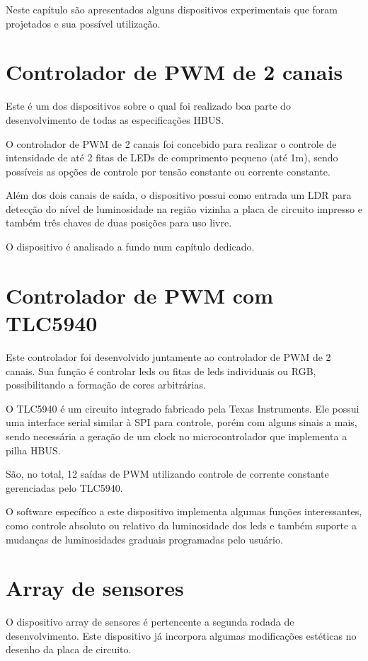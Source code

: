 Neste capítulo são apresentados alguns dispositivos experimentais que foram projetados e sua possível utilização.

\section{Controlador de PWM de 2 canais}

Este é um dos dispositivos sobre o qual foi realizado boa parte do desenvolvimento de todas as especificações HBUS.

O controlador de PWM de 2 canais foi concebido para realizar o controle de intensidade de até 2 fitas de LEDs de comprimento pequeno (até 1m), sendo possíveis as opções de controle por tensão constante ou corrente constante.

Além dos dois canais de saída, o dispositivo possui como entrada um LDR para detecção do nível de luminosidade na região vizinha a placa de circuito impresso e também três chaves de duas posições para uso livre.

O dispositivo é analisado a fundo num capítulo dedicado.

\section{Controlador de PWM com TLC5940}

Este controlador foi desenvolvido juntamente ao controlador de PWM de 2 canais. Sua função é controlar leds ou fitas de leds individuais ou RGB, possibilitando a formação de cores arbitrárias.

O TLC5940 é um circuito integrado fabricado pela Texas Instruments. Ele possui uma interface serial similar à SPI para controle, porém com alguns sinais a mais, sendo necessária a geração de um clock no microcontrolador que implementa a pilha HBUS.

São, no total, 12 saídas de PWM utilizando controle de corrente constante gerenciadas pelo TLC5940.

O software específico a este dispositivo implementa algumas funções interessantes, como controle absoluto ou relativo da luminosidade dos leds e também suporte a mudanças de luminosidades graduais programadas pelo usuário.

\section{Array de sensores}

O dispositivo array de sensores é pertencente a segunda rodada de desenvolvimento. Este dispositivo já incorpora algumas modificações estéticas no desenho da placa de circuito.


